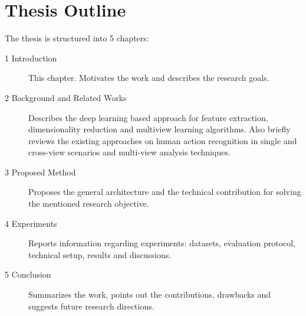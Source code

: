     \section{Thesis Outline} \label{sec:intro_outline}
        The thesis is structured into 5 chapters:
        \begin{description}
            \item[1 Introduction] This chapter. Motivates the work and describes the research goals.
            \item[2 Background and Related Works] Describes the deep learning based approach for feature extraction, dimensionality reduction and multiview learning algorithms. Also briefly reviews the existing approaches on human action recognition in single and cross-view scenarios and multi-view analysis techniques.
            \item[3 Proposed Method] Proposes the general architecture and the technical contribution for solving the mentioned research objective.
            \item[4 Experiments] Reports information regarding experiments: datasets, evaluation protocol, technical setup, results and discussions.
            \item[5 Conclusion] Summarizes the work, points out the contributions, drawbacks and suggests future research directions.
        \end{description}
